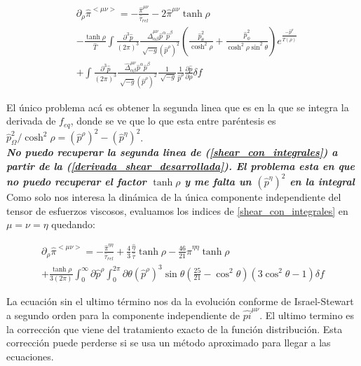 \documentclass[11pt,a4paper]{article}
\begin{document}
\begin{eqnarray}
&\partial_{\rho}\hat{\pi}^{<{\mu}{\nu}>}=-\frac{\hat{\pi}^{{\mu}{\nu}}}{\hat{\tau}_{rel}}-2\hat{\pi}^{{\mu}{\nu}}\tanh\rho\nonumber\\
&-\frac{\tanh\rho}{\hat{T}}\int{\frac{\partial^3\hat{p}}{(2\pi)^3}}\frac{\hat{\Delta}^{{\mu}{\nu}}_{{\alpha}{\beta}}\hat{p}^{\alpha}\hat{p}^{\beta}}{{\sqrt[]{-g}(\hat{p}^{\rho})^2}}(\frac{\hat{p}_{\theta}^2}{\cosh^2\rho}+\frac{\hat{p}_{\phi}^2}{\cosh^2\rho\sin^2\theta})e^{\frac{-\hat{p}^{\rho}}{\hat{T}(\rho)}}\nonumber\\
&+\int{\frac{\partial^3\hat{p}}{(2\pi)^3}}\frac{\hat{\Delta}^{{\mu}{\nu}}_{{\alpha}{\beta}}\hat{p}^{\alpha}\hat{p}^{\beta}}{{\sqrt[]{-g}(\hat{p}^{\rho})^2}}\frac{1}{\sqrt[]{-g}}\frac{1}{\hat{p}^\rho}\frac{\partial\hat{p}}{\partial\rho}\delta{f}
\label{shear_con_integrales}
\end{eqnarray}

El único problema acá es obtener la segunda linea  que es en la que se integra la derivada de $f_{eq}$, donde se ve que lo que esta entre paréntesis es $\hat{p}_{\Omega}^2/\cosh^2\rho=(\hat{p}^{\rho})^2-(\hat{p}^{\eta})^2$.\\

{\Large{\textbf{\textit{ No puedo recuperar la segunda linea de (\ref{shear_con_integrales}) a partir de la (\ref{derivada_shear_desarrollada}). El problema esta en que no puedo recuperar el factor $\tanh\rho$ y me falta un $(\hat{p}^{\eta})^2$ en la integral}}}}\\

Como solo nos interesa la dinámica de la única componente independiente del tensor de esfuerzos viscosos, evaluamos los indices de \ref{shear_con_integrales} en $\mu=\nu=\eta$ quedando:

\begin{eqnarray}
\partial_{\rho}\hat{\pi}^{<{\mu}{\nu}>}=
-\frac{\hat{\pi}^{{\eta}{\eta}}}{\hat{\tau}_{rel}}
+\frac{4}{3}\frac{\hat{\eta}}{\hat{\tau}}\tanh\rho
-\frac{46}{21}\hat{\pi}^{\eta\eta}\tanh\rho\nonumber\\
+\frac{\tanh\rho}{3(2\pi)}\int_{0}^{\infty}\partial\hat{p}^{\rho}\int_{0}^{2\pi}\partial\theta(\hat{p}^{\rho})^3\sin\theta(\frac{25}{21}-\cos^2\theta)(3\cos^2\theta-1)\delta{f}
\label{shear_exacta}
\end{eqnarray}

La ecuación sin el ultimo término nos da la evolución conforme de Israel-Stewart a segundo orden para la componente independiente de $\hat{pi}^{{\mu}{\nu}}$. El ultimo termino es la corrección que viene del tratamiento exacto de la función distribución. Esta corrección puede perderse si se usa un método aproximado para llegar a las ecuaciones.
\end{document}
